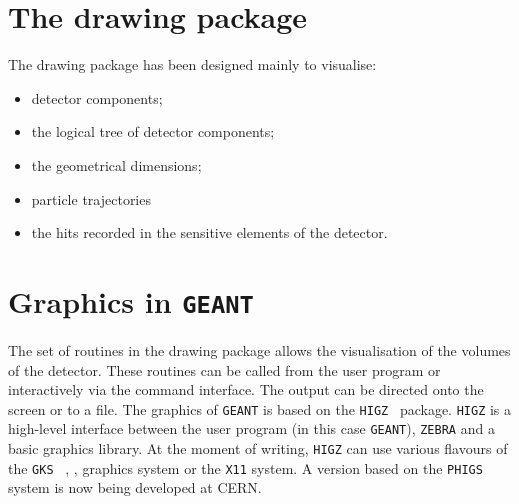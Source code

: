   
\section {The drawing package }
The drawing package has been designed mainly to visualise:
\begin {itemize}
\item  detector components;
\item  the logical tree of detector components;
\item  the geometrical dimensions;
\item  particle trajectories
\item  the hits recorded in the sensitive elements of the detector.
\end{itemize}
\section{Graphics in {\tt GEANT}}

The set of routines in the drawing package
allows the visualisation of the volumes of the detector.
These routines can be called from the user program or interactively via
the command interface. The output can be directed onto the screen or to a 
file. The graphics of {\tt GEANT} is based on the 
{\tt HIGZ}~\cite{bib-HIGZ} package. 
%
{\tt HIGZ} is a high-level interface between the user program (in this
case {\tt GEANT}), {\tt ZEBRA} and a basic graphics library.
At the moment of writing, {\tt HIGZ} can use various flavours
of the {\tt GKS}~%
                 {\cite{bib-gks2d}, \cite{bib-gks3d}, \cite{bib-GKS1}}
graphics system or the {\tt X11}\cite{bib-X11} system. A version based on
the {\tt PHIGS}\cite{bib-phigs} system is now being developed at CERN.

